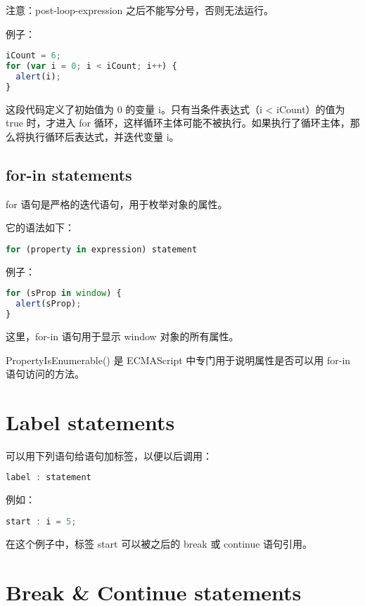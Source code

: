 注意：post-loop-expression 之后不能写分号，否则无法运行。

例子：

\begin{lstlisting}[language=JavaScript]
iCount = 6;
for (var i = 0; i < iCount; i++) {
  alert(i);
}
\end{lstlisting}

这段代码定义了初始值为 0 的变量 i。只有当条件表达式（i < iCount）的值为 true 时，才进入 for 循环，这样循环主体可能不被执行。如果执行了循环主体，那么将执行循环后表达式，并迭代变量 i。

\section{for-in statements}


for 语句是严格的迭代语句，用于枚举对象的属性。

它的语法如下：


\begin{lstlisting}[language=JavaScript]
for (property in expression) statement
\end{lstlisting}

例子：


\begin{lstlisting}[language=JavaScript]
for (sProp in window) {
  alert(sProp);
}
\end{lstlisting}

这里，for-in 语句用于显示 window 对象的所有属性。

PropertyIsEnumerable() 是 ECMAScript 中专门用于说明属性是否可以用 for-in 语句访问的方法。

\chapter{Label statements}

可以用下列语句给语句加标签，以便以后调用：


\begin{lstlisting}[language=JavaScript]
label : statement
\end{lstlisting}

例如：

\begin{lstlisting}[language=JavaScript]
start : i = 5;
\end{lstlisting}

在这个例子中，标签 start 可以被之后的 break 或 continue 语句引用。




\chapter{Break \& Continue statements}


